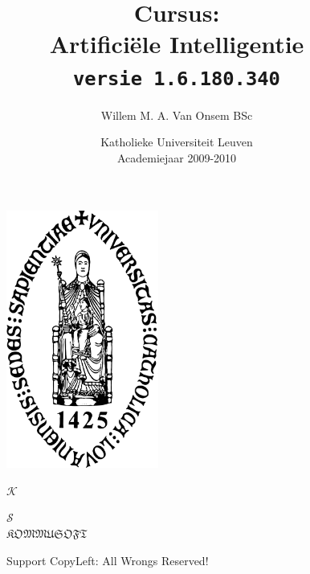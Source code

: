 \documentclass[titlepage,a4paper,twoside]{article}
\title{Cursus:\\Artificiële Intelligentie\\\texttt{\small versie 1.6.180.340}}
\author{Willem M. A. Van Onsem BSc}
\date{Katholieke Universiteit Leuven\\Academiejaar 2009-2010}
\begin{document}
\begin{titlepage}
\begin{figure}[t]
\centering
\includegraphics[width=5cm]{sedesVcrop.pdf}
\end{figure}
\begin{figure}[b]
\centering
\begin{tiny}
$\mathcal{K}$
\end{tiny}
\begin{Huge}
\textcopyleft
\end{Huge}
\begin{tiny}
$\mathcal{S}$\\
$\mathfrak{KOMMUSOFT}$
\end{tiny}
\caption{Support CopyLeft: All Wrongs Reserved!}
\end{figure}
\maketitle
\end{titlepage}
\tableofcontents
\newpage
\end{document}
